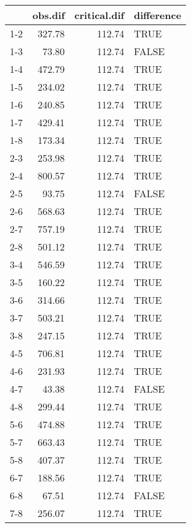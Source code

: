 \begin{table}[ht]
\centering
\begin{tabular}{rrrl}
  \hline
 & obs.dif & critical.dif & difference \\ 
  \hline
1-2 & 327.78 & 112.74 & TRUE \\ 
  1-3 & 73.80 & 112.74 & FALSE \\ 
  1-4 & 472.79 & 112.74 & TRUE \\ 
  1-5 & 234.02 & 112.74 & TRUE \\ 
  1-6 & 240.85 & 112.74 & TRUE \\ 
  1-7 & 429.41 & 112.74 & TRUE \\ 
  1-8 & 173.34 & 112.74 & TRUE \\ 
  2-3 & 253.98 & 112.74 & TRUE \\ 
  2-4 & 800.57 & 112.74 & TRUE \\ 
  2-5 & 93.75 & 112.74 & FALSE \\ 
  2-6 & 568.63 & 112.74 & TRUE \\ 
  2-7 & 757.19 & 112.74 & TRUE \\ 
  2-8 & 501.12 & 112.74 & TRUE \\ 
  3-4 & 546.59 & 112.74 & TRUE \\ 
  3-5 & 160.22 & 112.74 & TRUE \\ 
  3-6 & 314.66 & 112.74 & TRUE \\ 
  3-7 & 503.21 & 112.74 & TRUE \\ 
  3-8 & 247.15 & 112.74 & TRUE \\ 
  4-5 & 706.81 & 112.74 & TRUE \\ 
  4-6 & 231.93 & 112.74 & TRUE \\ 
  4-7 & 43.38 & 112.74 & FALSE \\ 
  4-8 & 299.44 & 112.74 & TRUE \\ 
  5-6 & 474.88 & 112.74 & TRUE \\ 
  5-7 & 663.43 & 112.74 & TRUE \\ 
  5-8 & 407.37 & 112.74 & TRUE \\ 
  6-7 & 188.56 & 112.74 & TRUE \\ 
  6-8 & 67.51 & 112.74 & FALSE \\ 
  7-8 & 256.07 & 112.74 & TRUE \\ 
   \hline
\end{tabular}
\end{table}
